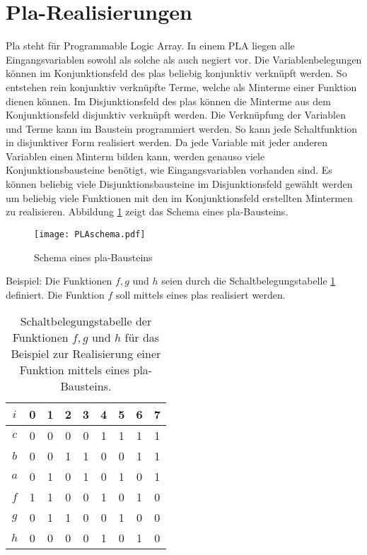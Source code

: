 \section{{\sc Pla}-Realisierungen}
{\sc Pla} steht für Programmable Logic Array. In einem PLA liegen alle Eingangsvariablen sowohl als solche als auch negiert vor. Die Variablenbelegungen können im Konjunktionsfeld des {\sc pla}s beliebig konjunktiv verknüpft werden. So entstehen rein konjunktiv verknüpfte Terme, welche als Minterme einer Funktion dienen können. Im Disjunktionsfeld des {\sc pla}s können die Minterme aus dem Konjunktionsfeld disjunktiv verknüpft werden. Die Verknüpfung der Variablen und Terme kann im Baustein programmiert werden. So kann jede Schaltfunktion in disjunktiver Form realisiert werden.
Da jede Variable mit jeder anderen Variablen einen Minterm bilden kann, werden genauso viele Konjunktionsbausteine benötigt, wie Eingangsvariablen vorhanden sind. Es können beliebig viele Disjunktionsbausteine im Disjunktionsfeld gewählt werden um beliebig viele Funktionen mit den im Konjunktionsfeld erstellten Mintermen zu realisieren. Abbildung \ref{PLAschem} zeigt das Schema eines {\sc pla}-Bausteins.  
\begin{figure}[htp]
	\centering
	\texttt{[image: PLAschema.pdf]}
	\caption{Schema eines {\sc pla}-Bausteins}
	\label{PLAschem}
\end{figure}

Beispiel: Die Funktionen $f, g$ und $h$ seien durch die Schaltbelegungstabelle \ref{PlaBspSBT} definiert. Die Funktion $f$ soll mittels eines {\sc pla}s realisiert werden.
\begin{table}[htp]
\centering
\begin{tabular}{*{9}{c}}
$i$ & 0 & 1 & 2 & 3 & 4 & 5 & 6 & 7 \\ \hline
$c$ & 0 & 0 & 0 & 0 & 1 & 1 & 1 & 1 \\
$b$ & 0 & 0 & 1 & 1 & 0 & 0 & 1 & 1 \\
$a$ & 0 & 1 & 0 & 1 & 0 & 1 & 0 & 1 \\ \hline
$f$ & 1 & 1 & 0 & 0 & 1 & 0 & 1 & 0 \\ \hline
$g$ & 0 & 1 & 1 & 0 & 0 & 1 & 0 & 0 \\ \hline
$h$ & 0 & 0 & 0 & 0 & 1 & 0 & 1 & 0 \\
\end{tabular}
\caption{Schaltbelegungstabelle der Funktionen $f, g$ und $h$ für das Beispiel zur Realisierung einer Funktion mittels eines {\sc pla}-Bausteins.}
\label{PlaBspSBT}
\end{table}


